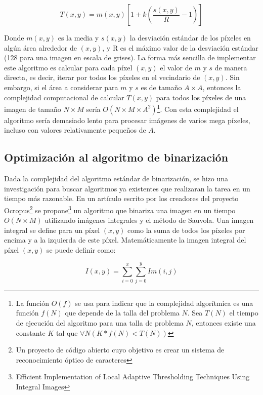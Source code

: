 \documentclass[a4paper, 11pt, oneside]{report}
\begin{document}
\begin{equation}\label{rSauvola}
	T(x,y)=m(x,y)\left[ 1 + k(\frac{s(x,y)}{R}-1) \right]
\end{equation}

Donde $m(x,y)$ es la media y $s(x,y)$ la desviación estándar de los píxeles en algún área alrededor de $(x,y)$, y R es el máximo valor de la desviación estándar (128 para una imagen en escala de grises). La forma más sencilla de implementar este algoritmo es calcular para cada píxel $(x,y)$ el valor de $m$ y $s$ de manera directa, es decir, iterar por todos los píxeles en el vecindario de $(x,y)$. Sin embargo, si el área a considerar para $m$ y $s$ es de tamaño $A \times A$, entonces la complejidad computacional de calcular $T(x,y)$ para todos los píxeles de una imagen de tamaño $N \times M$ sería $O(N \times M \times A^{2})$\footnote{La función $O(f)$ se usa para indicar que la complejidad algorítmica es una función $f(N)$ que depende de la talla del problema $N$. Sea $T(N)$ el tiempo de  ejecución del algoritmo para una talla de problema $N$, entonces existe una constante $K$ tal que  $\forall N ( K*f(N) < T(N) ) $}. Con esta complejidad el algoritmo sería demasiado lento para procesar imágenes de varios mega píxeles, incluso con valores relativamente pequeños de $A$.

\subsection{Optimización al algoritmo de binarización}

Dada la complejidad del algoritmo estándar de binarización, se hizo una investigación para buscar algoritmos ya existentes que realizaran la tarea en un tiempo más razonable. En un artículo escrito por los creadores del proyecto Ocropus\footnote{Un proyecto de código abierto cuyo objetivo es crear un sistema de reconocimiento óptico de caracteres} se propone\footnote{Efficient Implementation of Local Adaptive Thresholding Techniques Using Integral Images} un algoritmo que binariza una imagen en un tiempo $O(N \times M)$ utilizando imágenes integrales y el método de Sauvola. Una imagen integral se define para un píxel $(x, y)$ como la suma de todos los píxeles por encima y a la izquierda de este píxel. Matemáticamente la imagen integral del píxel $(x, y)$ se puede definir como:

\begin{equation}
	I(x, y) = \sum_{i=0}^{x}\sum_{j=0}^{y}Im(i, j)
\end{equation}
\end{document}
